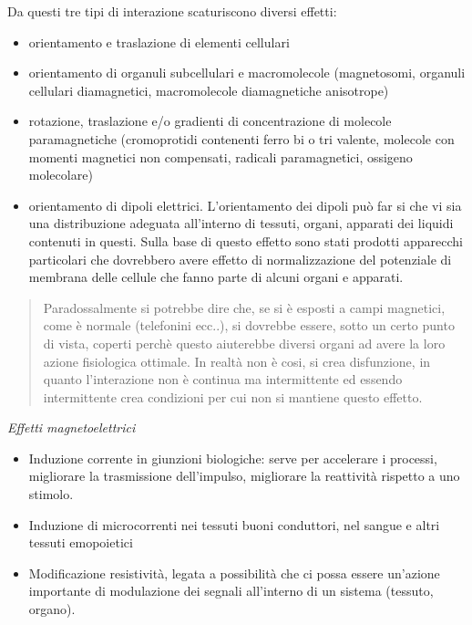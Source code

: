 \documentclass[]{article}
\begin{document}
Da questi tre tipi di interazione scaturiscono diversi effetti:

\begin{itemize}
\item
  orientamento e traslazione di elementi cellulari
\item
  orientamento di organuli subcellulari e macromolecole (magnetosomi,
  organuli cellulari diamagnetici, macromolecole diamagnetiche
  anisotrope)
\item
  rotazione, traslazione e/o gradienti di concentrazione di molecole
  paramagnetiche (cromoprotidi contenenti ferro bi o tri valente,
  molecole con momenti magnetici non compensati, radicali paramagnetici,
  ossigeno molecolare)
\item
  orientamento di dipoli elettrici. L'orientamento dei dipoli può far si
  che vi sia una distribuzione adeguata all'interno di tessuti, organi,
  apparati dei liquidi contenuti in questi. Sulla base di questo effetto
  sono stati prodotti apparecchi particolari che dovrebbero avere
  effetto di normalizzazione del potenziale di membrana delle cellule
  che fanno parte di alcuni organi e apparati.
\end{itemize}

\begin{quote}
Paradossalmente si potrebbe dire che, se si è esposti a campi magnetici,
come è normale (telefonini ecc..), si dovrebbe essere, sotto un certo
punto di vista, coperti perchè questo aiuterebbe diversi organi ad avere
la loro azione fisiologica ottimale. In realtà non è cosi, si crea
disfunzione, in quanto l'interazione non è continua ma intermittente ed
essendo intermittente crea condizioni per cui non si mantiene questo
effetto.
\end{quote}

\emph{Effetti magnetoelettrici}

\begin{itemize}
\item
  Induzione corrente in giunzioni biologiche: serve per accelerare i
  processi, migliorare la trasmissione dell'impulso, migliorare la
  reattività rispetto a uno stimolo.
\item
  Induzione di microcorrenti nei tessuti buoni conduttori, nel sangue e
  altri tessuti emopoietici
\item
  Modificazione resistività, legata a possibilità che ci possa essere
  un'azione importante di modulazione dei segnali all'interno di un
  sistema (tessuto, organo).
\end{itemize}
\end{document}
